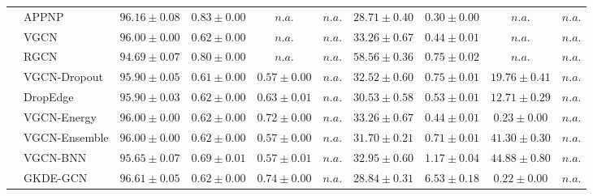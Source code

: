 \begin{table*}[!h]
{\begin{tabular}{ll|cccc|cccc}
        & APPNP & ${96.16\scriptscriptstyle \pm 0.08}$ & ${0.83\scriptscriptstyle \pm 0.00}$ & $n.a.$ & $n.a.$ & ${28.71\scriptscriptstyle \pm 0.40}$ & ${0.30\scriptscriptstyle \pm 0.00}$ & $n.a.$ & $n.a.$\\
        & VGCN & ${96.00\scriptscriptstyle \pm 0.00}$ & ${0.62\scriptscriptstyle \pm 0.00}$ & $n.a.$ & $n.a.$ & ${33.26\scriptscriptstyle \pm 0.67}$ & ${0.44\scriptscriptstyle \pm 0.01}$ & $n.a.$ & $n.a.$\\
        & RGCN & ${94.69\scriptscriptstyle \pm 0.07}$ & ${0.80\scriptscriptstyle \pm 0.00}$ & $n.a.$ & $n.a.$ & ${58.56\scriptscriptstyle \pm 0.36}$ & ${0.75\scriptscriptstyle \pm 0.02}$ & $n.a.$ & $n.a.$\\
        & VGCN-Dropout & ${95.90\scriptscriptstyle \pm 0.05}$ & ${0.61\scriptscriptstyle \pm 0.00}$ & ${0.57\scriptscriptstyle \pm 0.00}$ & $n.a.$ & ${32.52\scriptscriptstyle \pm 0.60}$ & ${0.75\scriptscriptstyle \pm 0.01}$ & ${19.76\scriptscriptstyle \pm 0.41}$ & $n.a.$\\
        & DropEdge & ${95.90\scriptscriptstyle \pm 0.03}$ & ${0.62\scriptscriptstyle \pm 0.00}$ & ${0.63\scriptscriptstyle \pm 0.01}$ & $n.a.$ & ${30.53\scriptscriptstyle \pm 0.58}$ & ${0.53\scriptscriptstyle \pm 0.01}$ & ${12.71\scriptscriptstyle \pm 0.29}$ & $n.a.$\\
        & VGCN-Energy & ${96.00\scriptscriptstyle \pm 0.00}$ & ${0.62\scriptscriptstyle \pm 0.00}$ & ${0.72\scriptscriptstyle \pm 0.00}$ & $n.a.$ & ${33.26\scriptscriptstyle \pm 0.67}$ & ${0.44\scriptscriptstyle \pm 0.01}$ & ${0.23\scriptscriptstyle \pm 0.00}$ & $n.a.$\\
        & VGCN-Ensemble & ${96.00\scriptscriptstyle \pm 0.00}$ & ${0.62\scriptscriptstyle \pm 0.00}$ & ${0.57\scriptscriptstyle \pm 0.00}$ & $n.a.$ & ${31.70\scriptscriptstyle \pm 0.21}$ & ${0.71\scriptscriptstyle \pm 0.01}$ & ${41.30\scriptscriptstyle \pm 0.30}$ & $n.a.$\\
        & VGCN-BNN & ${95.65\scriptscriptstyle \pm 0.07}$ & ${0.69\scriptscriptstyle \pm 0.01}$ & ${0.57\scriptscriptstyle \pm 0.01}$ & $n.a.$ & ${32.95\scriptscriptstyle \pm 0.60}$ & ${1.17\scriptscriptstyle \pm 0.04}$ & ${{44.88}\scriptscriptstyle \pm 0.80}$ & $n.a.$\\
        & GKDE-GCN & ${\mathbf{96.61}\scriptscriptstyle \pm 0.05}$ & ${0.62\scriptscriptstyle \pm 0.00}$ & ${0.74\scriptscriptstyle \pm 0.00}$ & $n.a.$ & ${28.84\scriptscriptstyle \pm 0.31}$ & ${{6.53}\scriptscriptstyle \pm 0.18}$ & ${0.22\scriptscriptstyle \pm 0.00}$ & $n.a.$\\

\end{tabular}}
\end{table*}
